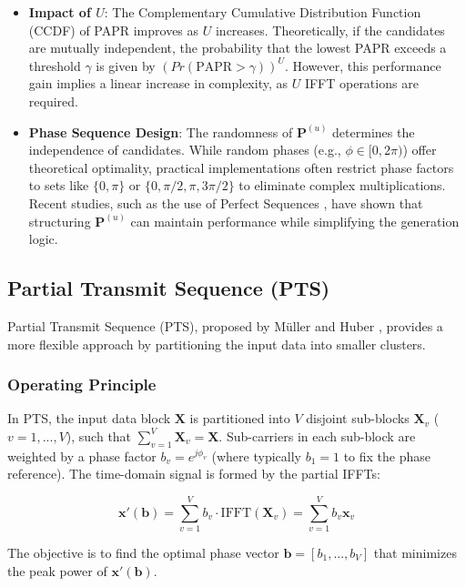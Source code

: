 \documentclass[journal]{IEEEtran}
\begin{document}
\begin{itemize}
    \item \textbf{Impact of $U$}: The Complementary Cumulative Distribution Function (CCDF) of PAPR improves as $U$ increases. Theoretically, if the candidates are mutually independent, the probability that the lowest PAPR exceeds a threshold $\gamma$ is given by $(Pr(\text{PAPR} > \gamma))^U$. However, this performance gain implies a linear increase in complexity, as $U$ IFFT operations are required.
    \item \textbf{Phase Sequence Design}: The randomness of $\mathbf{P}^{(u)}$ determines the independence of candidates. While random phases (e.g., $\phi \in [0, 2\pi)$) offer theoretical optimality, practical implementations often restrict phase factors to sets like $\{0, \pi\}$ or $\{0, \pi/2, \pi, 3\pi/2\}$ to eliminate complex multiplications. Recent studies, such as the use of Perfect Sequences \cite{ref7}, have shown that structuring $\mathbf{P}^{(u)}$ can maintain performance while simplifying the generation logic.
\end{itemize}

\subsection{Partial Transmit Sequence (PTS)}
Partial Transmit Sequence (PTS), proposed by Müller and Huber \cite{ref6}, provides a more flexible approach by partitioning the input data into smaller clusters.

\subsubsection{Operating Principle}
In PTS, the input data block $\mathbf{X}$ is partitioned into $V$ disjoint sub-blocks $\mathbf{X}_v$ ($v=1, ..., V$), such that $\sum_{v=1}^{V} \mathbf{X}_v = \mathbf{X}$. Sub-carriers in each sub-block are weighted by a phase factor $b_v = e^{j\phi_v}$ (where typically $b_1=1$ to fix the phase reference). The time-domain signal is formed by the partial IFFTs:

\begin{equation}
    \mathbf{x}'(\mathbf{b}) = \sum_{v=1}^{V} b_v \cdot \text{IFFT}(\mathbf{X}_v) = \sum_{v=1}^{V} b_v \mathbf{x}_v
\end{equation}

The objective is to find the optimal phase vector $\mathbf{b} = [b_1, ..., b_V]$ that minimizes the peak power of $\mathbf{x}'(\mathbf{b})$.
\end{document}
